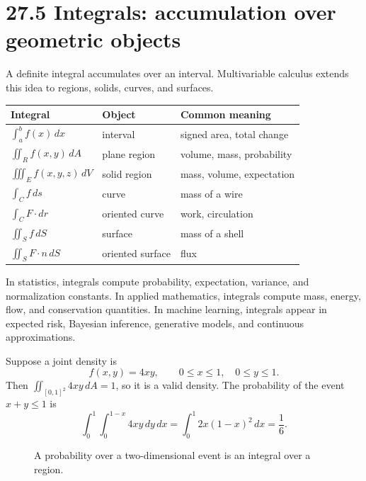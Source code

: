 \documentclass[11pt]{article}
\begin{document}
\section*{27.5 Integrals: accumulation over geometric objects}

A definite integral accumulates over an interval. Multivariable calculus extends this idea to regions, solids, curves, and surfaces.

\begin{center}
\renewcommand{\arraystretch}{1.14}
\begin{tabularx}{\textwidth}{p{}p{}X}
\toprule
Integral & Object & Common meaning\\
\midrule
$\int_a^b f(x)\,dx$ & interval & signed area, total change\\
$\iint_R f(x,y)\,dA$ & plane region & volume, mass, probability\\
$\iiint_E f(x,y,z)\,dV$ & solid region & mass, volume, expectation\\
$\int_C f\,ds$ & curve & mass of a wire\\
$\int_C F\cdot dr$ & oriented curve & work, circulation\\
$\iint_S f\,dS$ & surface & mass of a shell\\
$\iint_S F\cdot n\,dS$ & oriented surface & flux\\
\bottomrule
\end{tabularx}
\end{center}

In statistics, integrals compute probability, expectation, variance, and normalization constants. In applied mathematics, integrals compute mass, energy, flow, and conservation quantities. In machine learning, integrals appear in expected risk, Bayesian inference, generative models, and continuous approximations.

\begin{examplebox}
Suppose a joint density is
\[
f(x,y)=4xy,\qquad 0\le x\le 1,\quad 0\le y\le 1.
\]
Then $\iint_{[0,1]^2}4xy\,dA=1$, so it is a valid density. The probability of the event $x+y\le 1$ is
\[
\int_0^1\int_0^{1-x}4xy\,dy\,dx
=\int_0^1 2x(1-x)^2\,dx=\frac16.
\]
\end{examplebox}

\begin{figure}[H]
\centering
{}
\caption{A probability over a two-dimensional event is an integral over a region.}
\end{figure}
\end{document}
